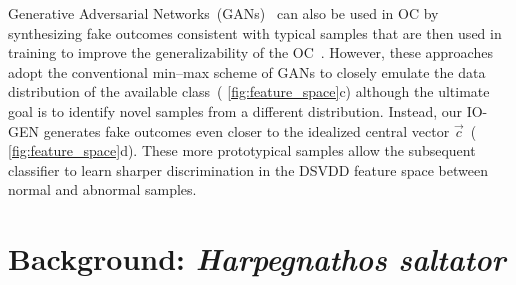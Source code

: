 \documentclass[letterpaper]{article} %
\let\orgautoref\autoref
\renewcommand{\autoref}
{\def\equationautorefname{Equation}%
	\def\figureautorefname{Fig.}%
	\def\subfigureautorefname{Fig.}%
	\def\Itemautorefname{item}%
	\def\tableautorefname{Table}%
	\def\exerciseautorefname{Exercise}%
	\def\starexerciseautorefname{Exercise}%
	\def\sectionautorefname{Section}%
	\def\subsectionautorefname{Section}%
	\def\subsubsectionautorefname{Section}%
	\def\chapterautorefname{Section}%
	\def\partautorefname{Part}%
	\orgautoref}
\begin{document}
Generative Adversarial Networks~(GANs)~\citep{GPMXWOCB14} can also be
used in OC by synthesizing fake outcomes consistent with typical samples
that are then used in training to improve the generalizability of the
OC~\citep{SKFA18, YCR20, PNX19}. However, these approaches adopt the
conventional min--max scheme of GANs to closely emulate the data
distribution of the available class~(\autoref{fig:feature_space}c)
although the ultimate goal is to identify novel samples from a different
distribution. Instead, our \mbox{IO-GEN} generates fake outcomes even closer to
the idealized central vector $\vec{c}$~(\autoref{fig:feature_space}d).
These more prototypical samples allow the subsequent classifier to learn
sharper discrimination in the DSVDD feature space between normal and
abnormal samples.




\section{Background: \emph{Harpegnathos saltator}}
\label{sec:background}
%
%
\end{document}
